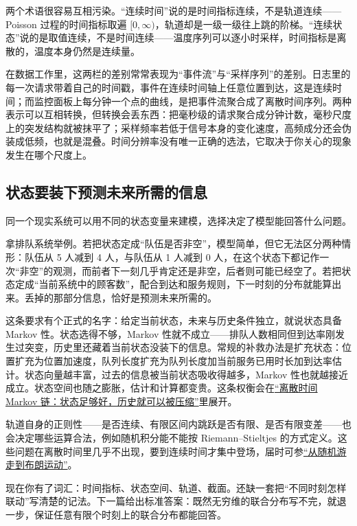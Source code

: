 两个术语很容易互相污染。``连续时间''说的是时间指标连续，不是轨道连续——Poisson 过程的时间指标取遍 \([0,\infty)\)，轨道却是一级一级往上跳的阶梯。``连续状态''说的是取值连续，不是时间连续——温度序列可以逐小时采样，时间指标是离散的，温度本身仍然是连续量。

在数据工作里，这两栏的差别常常表现为``事件流''与``采样序列''的差别。日志里的每一次请求带着自己的时间戳，事件在连续时间轴上任意位置到达，这是连续时间；而监控面板上每分钟一个点的曲线，是把事件流聚合成了离散时间序列。两种表示可以互相转换，但转换会丢东西：把毫秒级的请求聚合成分钟计数，毫秒尺度上的突发结构就被抹平了；采样频率若低于信号本身的变化速度，高频成分还会伪装成低频，也就是混叠。时间分辨率没有唯一正确的选法，它取决于你关心的现象发生在哪个尺度上。

\subsection{状态要装下预测未来所需的信息}

同一个现实系统可以用不同的状态变量来建模，选择决定了模型能回答什么问题。

拿排队系统举例。若把状态定成``队伍是否非空''，模型简单，但它无法区分两种情形：队伍从 5 人减到 4 人，与队伍从 1 人减到 0 人，在这个状态下都记作一次``非空''的观测，而前者下一刻几乎肯定还是非空，后者则可能已经空了。若把状态定成``当前系统中的顾客数''，配合到达和服务规则，下一时刻的分布就能算出来。丢掉的那部分信息，恰好是预测未来所需的。

这条要求有个正式的名字：给定当前状态，未来与历史条件独立，就说状态具备 Markov 性。状态选得不够，Markov 性就不成立——排队人数相同但到达率刚发生过突变，历史里还藏着当前状态没装下的信息。常规的补救办法是扩充状态：位置扩充为位置加速度，队列长度扩充为队列长度加当前服务已用时长加到达率估计。状态向量越丰富，过去的信息被当前状态吸收得越多，Markov 性也就越接近成立。状态空间也随之膨胀，估计和计算都变贵。这条权衡会在\hyperref[ch:048]{``离散时间 Markov 链：状态足够好，历史就可以被压缩''}里展开。

轨道自身的正则性——是否连续、有限区间内跳跃是否有限、是否有限变差——也会决定哪些运算合法，例如随机积分能不能按 Riemann--Stieltjes 的方式定义。这些问题在离散时间里几乎不出现，要到连续时间才集中登场，届时可参\hyperref[sec:06-Random-Processes/06-Diffusion-and-SDE/01]{``从随机游走到布朗运动''}。

现在你有了词汇：时间指标、状态空间、轨道、截面。还缺一套把``不同时刻怎样联动''写清楚的记法。下一篇给出标准答案：既然无穷维的联合分布写不完，就退一步，保证任意有限个时刻上的联合分布都能回答。

